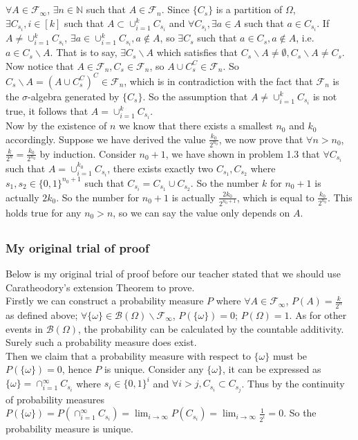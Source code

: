 \documentclass[12pt,letterpaper]{article}
\begin{document}
\subsection{}
$\forall A\in\mathcal{F}_{\infty}$, $\exists n\in\mathbb{N}$ such that $A\in\mathcal{F}_{n}$. Since $\{C_s\}$ is a partition of $\Omega$, $\exists C_{s_i}, i\in[k]$ such that $A\subset\cup_{i=1}^{k}C_{s_i}$ and $\forall C_{s_i},\exists a\in A$ such that $a\in C_{s_i}$. If $A\neq\cup_{i=1}^{k}C_{s_i}$, $\exists a\in\cup_{i=1}^kC_{s_i},a\notin A$, so $\exists C_s$ such that $a\in C_s,a\notin A$, i.e. $a\in C_s\backslash A$. That is to say, $\exists C_s\backslash A$ which satisfies that $C_s\backslash A\neq\emptyset, C_s\backslash A\neq C_s$. \\
Now notice that $A\in\mathcal{F}_n,C_s\in\mathcal{F}_n$, so $A\cup C_s^C\in\mathcal{F}_n$. So $C_s\backslash A=(A\cup C_s^C)^C\in\mathcal{F}_n$, which is in contradiction with the fact that $\mathcal{F}_n$ is the $\sigma$-algebra generated by $\{C_s\}$. So the assumption that $A\neq\cup_{i=1}^k C_{s_i}$ is not true, it follows that $A=\cup_{i=1}^k C_{s_i}$.\\
Now by the existence of $n$ we know that there exists a smallest $n_0$ and $k_0$ accordingly. Suppose we have derived the value $\frac{k_0}{2^{n_0}}$, we now prove that $\forall n>n_0$, $\frac{k}{2^n}=\frac{k_0}{2^{n_0}}$ by induction. Consider $n_0+1$, we have shown in problem 1.3 that $\forall C_{s_i}$ such that $A=\cup_{i=1}^{k_0} C_{s_i}$, there exists exactly two $C_{s_1},C_{s_2}$ where $s_1,s_2\in \{0,1\}^{n_0+1}$ such that $C_{s_i}=C_{s_1}\cup C_{s_2}$. So the number $k$ for $n_0+1$ is actually $2k_0$. So the number for $n_0+1$ is actually $\frac{2k_0}{2^{n_0+1}}$, which is equal to $\frac{k_0}{2^{n_0}}$. This holds true for any $n_0>n$, so we can say the value only depends on $A$.
\subsection{}
\subsubsection{My original trial of proof}
Below is my original trial of proof before our teacher stated that we should use Caratheodory's extension Theorem to prove.\\
Firstly we can construct a probability measure $P$ where $\forall A\in\mathcal{F}_{\infty}$, $P(A)=\frac{k}{2^n}$ as defined above; $\forall \{\omega\}\in\mathcal{B}(\Omega)\backslash\mathcal{F}_{\infty}$, $P(\{\omega\})=0$; $P(\Omega)=1$. As for other events in $\mathcal{B}(\Omega)$, the probability can be calculated by the countable additivity. Surely such a probability measure does exist.\\
Then we claim that a probability measure with respect to $\{\omega\}$ must be $P(\{\omega\})=0$, hence $P$ is unique. Consider any $\{\omega\}$, it can be expressed as $\{\omega\}=\cap_{i=1}^{\infty}C_{s_i}$ where $s_i\in\{0,1\}^{i}$ and $\forall i>j, C_{s_i}\subset C_{s_j}$. Thus by the continuity of probability measures $P(\{\omega\})=P(\cap_{i=1}^{\infty}C_{s_i})=\lim_{i\to \infty}P(C_{s_i})=\lim_{i\to\infty}\frac{1}{2^i}=0$. So the probability measure is unique. 
\end{document}
